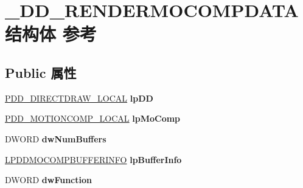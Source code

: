 \hypertarget{struct___d_d___r_e_n_d_e_r_m_o_c_o_m_p_d_a_t_a}{}\section{\+\_\+\+D\+D\+\_\+\+R\+E\+N\+D\+E\+R\+M\+O\+C\+O\+M\+P\+D\+A\+T\+A结构体 参考}
\label{struct___d_d___r_e_n_d_e_r_m_o_c_o_m_p_d_a_t_a}
\subsection*{Public 属性}
\begin{DoxyCompactItemize}
\item 
\mbox{\label{struct___d_d___r_e_n_d_e_r_m_o_c_o_m_p_d_a_t_a_ab2d00038bf418368507312bde1d3a2e7}} 
\hyperlink{struct___d_d___d_i_r_e_c_t_d_r_a_w___l_o_c_a_l}{P\+D\+D\+\_\+\+D\+I\+R\+E\+C\+T\+D\+R\+A\+W\+\_\+\+L\+O\+C\+AL} {\bfseries lp\+DD}
\item 
\mbox{\label{struct___d_d___r_e_n_d_e_r_m_o_c_o_m_p_d_a_t_a_a0ba6ddf0fcc33023771159be70fd58ef}} 
\hyperlink{struct_d_d___m_o_t_i_o_n_c_o_m_p___l_o_c_a_l}{P\+D\+D\+\_\+\+M\+O\+T\+I\+O\+N\+C\+O\+M\+P\+\_\+\+L\+O\+C\+AL} {\bfseries lp\+Mo\+Comp}
\item 
\mbox{\label{struct___d_d___r_e_n_d_e_r_m_o_c_o_m_p_d_a_t_a_a7d87792e2b82203952a16243f3d6ed39}} 
D\+W\+O\+RD {\bfseries dw\+Num\+Buffers}
\item 
\mbox{\label{struct___d_d___r_e_n_d_e_r_m_o_c_o_m_p_d_a_t_a_a3476e04e6bde1ed2bf2b09245f34959b}} 
\hyperlink{struct___d_d_m_o_c_o_m_p_b_u_f_f_e_r_i_n_f_o}{L\+P\+D\+D\+M\+O\+C\+O\+M\+P\+B\+U\+F\+F\+E\+R\+I\+N\+FO} {\bfseries lp\+Buffer\+Info}
\item 
\mbox{\label{struct___d_d___r_e_n_d_e_r_m_o_c_o_m_p_d_a_t_a_af4577d7b3c32a7286b1c11997556d4ba}} 
D\+W\+O\+RD {\bfseries dw\+Function}
\item 
\mbox{\label{struct___d_d___r_e_n_d_e_r_m_o_c_o_m_p_d_a_t_a_a77d585f69f9c6052d7d5d3ea64d5687a}} 

\end{DoxyCompactItemize}
